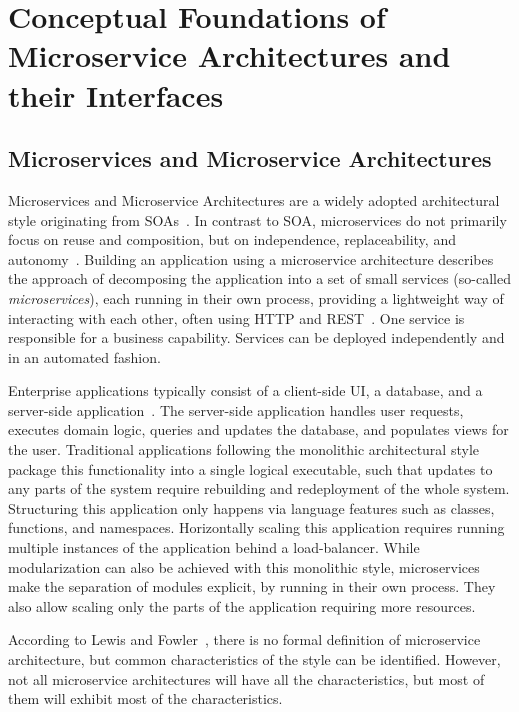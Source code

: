 \section{Conceptual Foundations of Microservice Architectures and their Interfaces}\label{sec:foundations}

\subsection{Microservices and Microservice Architectures}

Microservices and Microservice Architectures are a widely adopted architectural style originating from \acp{SOA}~\cite{Mazzara2020, Dragoni2017}.
In contrast to \ac{SOA}, microservices do not primarily focus on reuse and composition, but on independence, replaceability, and autonomy~\cite{Baresi2020, Thones2015}.
Building an application using a microservice architecture describes the approach of decomposing the application into a set of small services (so-called \textit{microservices}), each running in their own process, providing a lightweight way of interacting with each other, often using \ac{HTTP} and \ac{REST}~\cite{Lewis2014, Newman2015}.
One service is responsible for a business capability.
Services can be deployed independently and in an automated fashion.

Enterprise applications typically consist of a client-side \ac{UI}, a database, and a server-side application~\cite{Lewis2014}.
The server-side application handles user requests, executes domain logic, queries and updates the database, and populates views for the user.
Traditional applications following the monolithic architectural style package this functionality into a single logical executable, such that updates to any parts of the system require rebuilding and redeployment of the whole system.
Structuring this application only happens via language features such as classes, functions, and namespaces.
Horizontally scaling this application requires running multiple instances of the application behind a load-balancer.
While modularization can also be achieved with this monolithic style, microservices make the separation of modules explicit, by running in their own process.
They also allow scaling only the parts of the application requiring more resources.

According to Lewis and Fowler~\cite{Lewis2014}, there is no formal definition of microservice architecture, but common characteristics of the style can be identified.
However, not all microservice architectures will have all the characteristics, but most of them will exhibit most of the characteristics.

